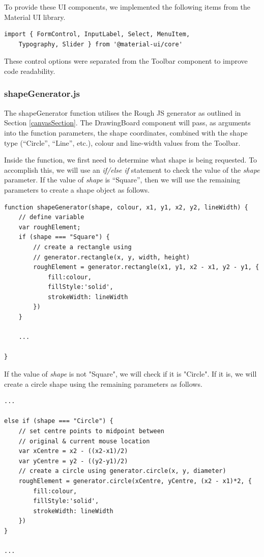 To provide these UI components, we implemented the following items from the Material UI library. 

\begin{verbatim}
import { FormControl, InputLabel, Select, MenuItem, 
    Typography, Slider } from '@material-ui/core'
\end{verbatim}

These control options were separated from the Toolbar component to improve code readability. 

\subsubsection{shapeGenerator.js}
The shapeGenerator function utilises the Rough JS generator as outlined in Section \ref{canvasSection}. The DrawingBoard component will pass, as arguments into the function parameters, the shape coordinates, combined with the shape type (“Circle”, “Line”, etc.), colour and line-width values from the Toolbar.  

Inside the function, we first need to determine what shape is being requested. To accomplish this, we will use an \textit{if/else if} statement to check the value of the \textit{shape} parameter. If the value of \textit{shape} is “Square”, then we will use the remaining parameters to create a shape object as follows.

\begin{verbatim}
function shapeGenerator(shape, colour, x1, y1, x2, y2, lineWidth) {
    // define variable
    var roughElement;
    if (shape === "Square") {
        // create a rectangle using 
        // generator.rectangle(x, y, width, height)
        roughElement = generator.rectangle(x1, y1, x2 - x1, y2 - y1, {
            fill:colour,
            fillStyle:'solid',
            strokeWidth: lineWidth
        })
    }
    
    ...
    
}
\end{verbatim}

If the value of \textit{shape} is not "Square", we will check if it is "Circle". If it is, we will create a circle shape using the remaining parameters as follows.

\begin{verbatim}
...

else if (shape === "Circle") {
    // set centre points to midpoint between 
    // original & current mouse location
    var xCentre = x2 - ((x2-x1)/2)
    var yCentre = y2 - ((y2-y1)/2)
    // create a circle using generator.circle(x, y, diameter)
    roughElement = generator.circle(xCentre, yCentre, (x2 - x1)*2, {
        fill:colour,
        fillStyle:'solid',
        strokeWidth: lineWidth
    })
}

...
\end{verbatim}

